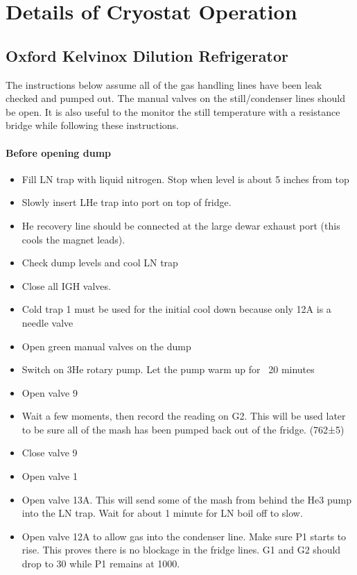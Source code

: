 \chapter{Details of Cryostat Operation}
\label{sec:cryostat}

\section{Oxford Kelvinox Dilution Refrigerator}
\label{sec:kelvinox}

The instructions below assume all of the gas handling lines have been leak checked and pumped out. The manual valves on the still/condenser lines should be open. It is also useful to the monitor the still temperature with a resistance bridge while following these instructions.

\subsubsection*{Before opening dump}

\begin{itemize}
\item Fill LN trap with liquid nitrogen. Stop when level is about 5 inches from top
\item Slowly insert LHe trap into port on top of fridge. 
\item He recovery line should be connected at the large dewar exhaust port (this cools the magnet leads).
\item Check dump levels and cool LN trap
\item Close all IGH valves. 
\item Cold trap 1 must be used for the initial cool down because only 12A is a needle valve
\item Open green manual valves on the dump
\item Switch on 3He rotary pump. Let the pump warm up for ~20 minutes
\item Open valve 9
\item Wait a few moments, then record the reading on G2. This will be used later to be sure all of the mash has been pumped back out of the fridge. (762±5)
\item Close valve 9
\item Open valve 1
\item Open valve 13A. This will send some of the mash from behind the He3 pump into the LN trap. Wait for about 1 minute for LN boil off to slow. 
\item Open valve 12A to allow gas into the condenser line. Make sure P1 starts to rise. This proves there is no blockage in the fridge lines. G1 and G2 should drop to 30 while P1 remains at 1000.
\end{itemize}

